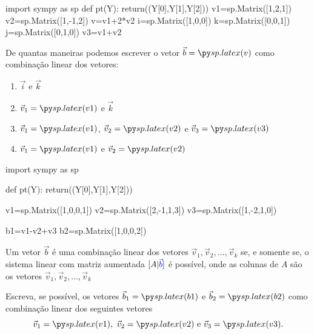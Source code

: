 \begin{frame}[label=lild,fragile]
\begin{pycode} 
import sympy as sp
def pt(Y):
 return((Y[0],Y[1],Y[2]))
v1=sp.Matrix([1,2,1])
v2=sp.Matrix([1,-1,2])
v=v1+2*v2
i=sp.Matrix([1,0,0])
k=sp.Matrix([0,0,1])
j=sp.Matrix([0,1,0])
v3=v1+v2
\end{pycode} 
 \hypertarget{exem.comb}{} 
\begin{exe}
De quantas maneiras podemos escrever o vetor {\color{blue}\(\vec{b}=\pyl{v}\)} como combinação linear dos vetores:\\
\begin{minipage}{0.4\textwidth}
\begin{enumerate}
\item \(\vec{i}\) e \(\vec{k}\)
\item \(\vec{v}_1=\pyl{v1}\) e \(\vec{k}\)
\end{enumerate}
\end{minipage}
\begin{minipage}{0.55\textwidth}
\begin{enumerate}
\setcounter{enumi}{2}
\item \(\vec{v}_1=\pyl{v1}\),  \(\vec{v}_2=\pyl{v2}\) e  \(\vec{v}_3=\pyl{v3}\)
\item \(\vec{v}_1=\pyl{v1}\) e \(\vec{v}_2=\pyl{v2}\)
\end{enumerate}
\end{minipage}
\end{exe}
\end{frame}


\begin{frame}[label=lild,fragile]
\begin{pycode} 
import sympy as sp

def pt(Y):
 return((Y[0],Y[1],Y[2]))

v1=sp.Matrix([1,0,0,1])
v2=sp.Matrix([2,-1,1,3])
v3=sp.Matrix([1,-2,1,0])

b1=v1-v2+v3 
b2=sp.Matrix([1,0,0,2])

\end{pycode} 
\begin{teo}
Um vetor {\color{blue} $\vec{b}$} é uma combinação linear dos vetores $\vec{v}_1, \vec{v}_2, \ldots, \vec{v}_k$ se, e somente se, o sistema linear com matriz aumentada  \([A \vert {\color{blue}\vec{b}}]\) é possível, onde as {\color{red}colunas de \(A\)} são os vetores $\vec{v}_1, \vec{v}_2, \ldots, \vec{v}_k$
\end{teo}

\begin{exe}
Escreva, se possível,  os vetores {\color{blue}\(\vec{b}_1=\pyl{b1}\)} e {\color{blue}\(\vec{b}_2=\pyl{b2}\)} como combinação linear dos seguintes vetores
\[
\vec{v}_1=\pyl{v1},\ \vec{v}_2=\pyl{v2} \text{ e } \vec{v}_3=\pyl{v3}.
\]
\end{exe}
\end{frame}


